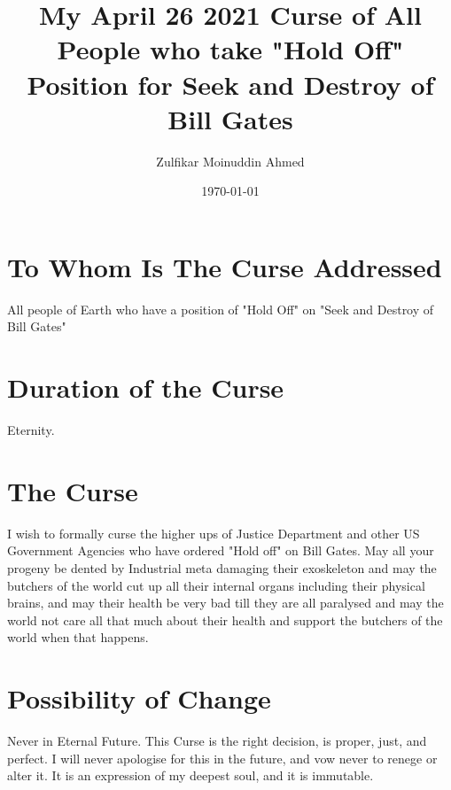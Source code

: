 \documentclass{amsart}
\title{My April 26 2021 Curse of All People who take "Hold Off" Position for Seek and Destroy of Bill Gates}
\author{Zulfikar Moinuddin Ahmed}
\date{\today}
\begin{document}
\maketitle

\section{To Whom Is The Curse Addressed}

All people of Earth who have a position of "Hold Off" on  "Seek and Destroy of Bill Gates"

\section{Duration of the Curse}

Eternity.
 
\section{The Curse}

I wish to formally curse the higher ups of Justice Department and other US Government Agencies who have ordered "Hold off" on Bill Gates.  May all your progeny be dented by Industrial meta damaging their exoskeleton and may the butchers of the world cut up all their internal organs including their physical brains, and may their health be very bad till they are all paralysed and may the world not care all that much about their health and support the butchers of the world when that happens.  

\section{Possibility of Change}

Never in Eternal Future.  This Curse is the right decision, is proper, just, and perfect.  I will never apologise for this in the future, and vow never to renege or alter it.  It is an expression of my deepest soul, and it is immutable.
\end{document}
